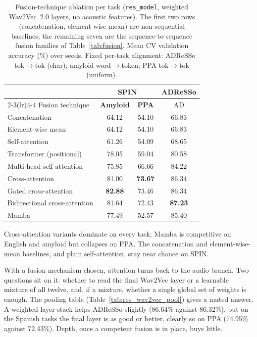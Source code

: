 \begin{table}[htbp]
\centering
\caption[Fusion-technique ablation per task]{Fusion-technique ablation per task (\texttt{res\_model}, weighted Wav2Vec~2.0 layers, no acoustic features). The first two rows (concatenation, element-wise mean) are non-sequential baselines; the remaining seven are the sequence-to-sequence fusion families of Table~\ref{tab:fusion}. Mean CV validation accuracy (\%) over seeds. Fixed per-task alignment: ADReSSo tok$\rightarrow$tok (char); amyloid word$\rightarrow$token; PPA tok$\rightarrow$tok (uniform).}
\label{tab:res_fusion}
\small
\begin{tabular}{lccc}
\toprule
 & \multicolumn{2}{c}{\textbf{SPIN}} & \textbf{ADReSSo} \\
\cmidrule(lr){2-3}\cmidrule(lr){4-4}
Fusion technique & \textbf{Amyloid} & \textbf{PPA} & AD \\
\midrule
Concatenation                 & 64.12 & 54.10 & 66.83 \\
Element-wise mean             & 64.12 & 54.10 & 66.83 \\
Self-attention                & 61.26 & 54.09 & 68.65 \\
Transformer (positional)      & 78.05 & 59.04 & 80.58 \\
Multi-head self-attention     & 75.85 & 66.66 & 84.22 \\
Cross-attention               & 81.00 & \textbf{73.67} & 86.34 \\
Gated cross-attention         & \textbf{82.88} & 73.46 & 86.34 \\
Bidirectional cross-attention & 81.64 & 72.43 & \textbf{87.23} \\
Mamba                         & 77.49 & 52.57 & 85.40 \\
\bottomrule
\end{tabular}

\vspace{2pt}
{\footnotesize Cross-attention variants dominate on every task; Mamba is competitive on English and amyloid but collapses on PPA. The concatenation and element-wise-mean baselines, and plain self-attention, stay near chance on SPIN.}
\end{table}

With a fusion mechanism chosen, attention turns back to the audio branch. Two questions sit on it: whether to read the final Wav2Vec layer or a learnable mixture of all twelve, and, if a mixture, whether a single global set of weights is enough. The pooling table (Table~\ref{tab:res_wav2vec_pool}) gives a muted answer. A weighted layer stack helps ADReSSo slightly (86.64\% against 86.32\%), but on the Spanish tasks the final layer is as good or better, clearly so on PPA (74.95\% against 72.43\%). Depth, once a competent fusion is in place, buys little.

